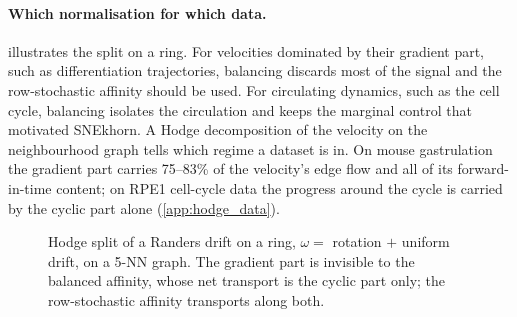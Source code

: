 \paragraph{Which normalisation for which data.}
 illustrates the split on a ring. For velocities
dominated by their gradient part, such as differentiation trajectories,
balancing discards most of the signal and the row-stochastic affinity
should be used. For circulating dynamics, such as the cell cycle,
balancing isolates the circulation and keeps the marginal control that
motivated SNEkhorn. A Hodge decomposition of the velocity on the
neighbourhood graph tells which regime a dataset is in. On mouse
gastrulation the gradient part carries 75--83\% of the velocity's edge
flow and all of its forward-in-time content; on RPE1 cell-cycle data the
progress around the cycle is carried by the cyclic part alone
(\cref{app:hodge_data}).

\begin{figure}[t]
  \centering
  \caption{Hodge split of a Randers drift on a ring, $\omega=$ rotation
  $+$ uniform drift, on a 5-NN graph. The gradient part is invisible to the
  balanced affinity, whose net transport is the cyclic part only; the
  row-stochastic affinity transports along both.}
  \label{fig:hodge}
\end{figure}
